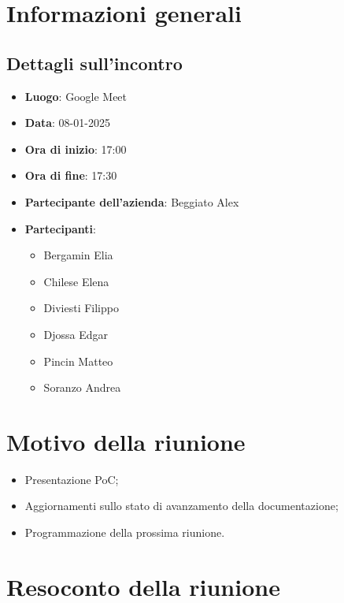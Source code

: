 \section{Informazioni generali}
\subsection{Dettagli sull'incontro}
\begin{itemize}
    \item \textbf{Luogo}: Google Meet
    \item \textbf{Data}: 08-01-2025
    \item \textbf{Ora di inizio}: 17:00
    \item \textbf{Ora di fine}: 17:30
    \item \textbf{Partecipante dell'azienda}: Beggiato Alex
    \item \textbf{Partecipanti}:
    \begin{itemize}
        \item Bergamin Elia
        \item Chilese Elena
        \item Diviesti Filippo
        \item Djossa Edgar
        \item Pincin Matteo 
        \item Soranzo Andrea  
    \end{itemize}
\end{itemize}

\section{Motivo della riunione}
\begin{itemize}
    \item Presentazione PoC;
    \item Aggiornamenti sullo stato di avanzamento della documentazione;
    \item Programmazione della prossima riunione.
\end{itemize}

\section{Resoconto della riunione}
